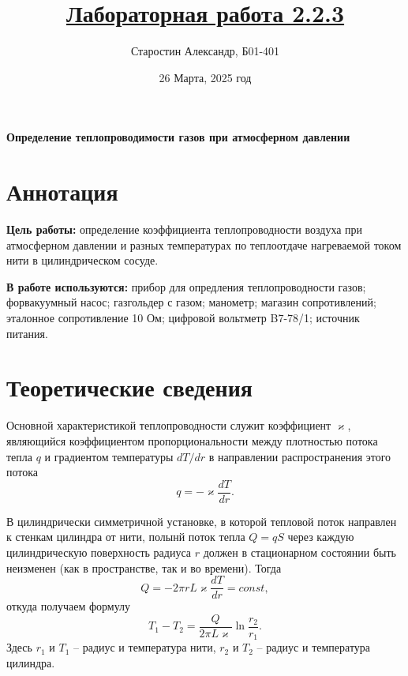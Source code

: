 \documentclass[a4paper]{article}
\title{\underline{Лабораторная работа 2.2.3}}
\author{Старостин Александр, Б01-401}
\date {26 Марта, 2025 год}
\begin{document}
\maketitle
\newpage

\textbf{Определение теплопроводимости газов при атмосферном давлении}

\section{Аннотация}
    \par \textbf{Цель работы:} определение коэффициента теплопроводности воздуха при атмосферном давлении и разных температурах по теплоотдаче нагреваемой током нити в цилиндрическом сосуде.  \\

    \par \textbf{В работе используются:} прибор для опредления теплопроводности газов; форвакуумный насос; газгольдер с газом; манометр; магазин сопротивлений; эталонное сопротивление 10 Ом; цифровой вольтметр B7-78/1; источник питания.

\section{Теоретические сведения}

          Основной характеристикой теплопроводности служит коэффициент $\varkappa$, являющийся коэффициентом пропорциональности между плотностью потока тепла $q$ и градиентом температуры $dT/dr$ в направлении распространения этого потока
\begin{equation}
	q = -\varkappa \frac{dT}{dr}.
\end{equation}

	В цилиндрически симметричной установке, в которой тепловой поток направлен к стенкам цилиндра от нити, полынй поток тепла $Q = qS$ через каждую цилиндрическую поверхность радиуса $r$ должен в стационарном состоянии быть неизменен (как в пространстве, так и во времени). Тогда
\begin{equation}
	Q = -2\pi rL\varkappa \frac{dT}{dr} = const,
\end{equation}
откуда получаем формулу
\begin{equation}
	\label{formula}
	T_1 - T_2 = \frac{Q}{2\pi L\varkappa} \ln \frac{r_2}{r_1}.
\end{equation}
Здесь $r_1$ и $T_1$ -- радиус и температура нити, $r_2$ и $T_2$ -- радиус и температура цилиндра.
\end{document}
